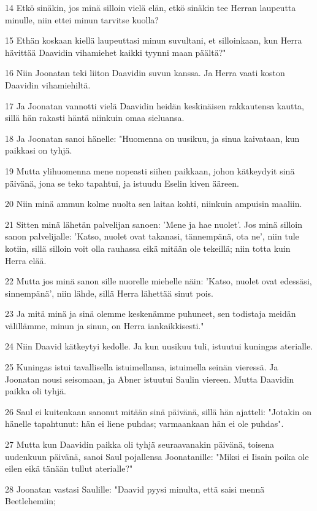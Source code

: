 \par 14 Etkö sinäkin, jos minä silloin vielä elän, etkö sinäkin tee Herran laupeutta minulle, niin ettei minun tarvitse kuolla?
\par 15 Ethän koskaan kiellä laupeuttasi minun suvultani, et silloinkaan, kun Herra hävittää Daavidin vihamiehet kaikki tyynni maan päältä?"
\par 16 Niin Joonatan teki liiton Daavidin suvun kanssa. Ja Herra vaati koston Daavidin vihamiehiltä.
\par 17 Ja Joonatan vannotti vielä Daavidin heidän keskinäisen rakkautensa kautta, sillä hän rakasti häntä niinkuin omaa sieluansa.
\par 18 Ja Joonatan sanoi hänelle: "Huomenna on uusikuu, ja sinua kaivataan, kun paikkasi on tyhjä.
\par 19 Mutta ylihuomenna mene nopeasti siihen paikkaan, johon kätkeydyit sinä päivänä, jona se teko tapahtui, ja istuudu Eselin kiven ääreen.
\par 20 Niin minä ammun kolme nuolta sen laitaa kohti, niinkuin ampuisin maaliin.
\par 21 Sitten minä lähetän palvelijan sanoen: 'Mene ja hae nuolet'. Jos minä silloin sanon palvelijalle: 'Katso, nuolet ovat takanasi, tännempänä, ota ne', niin tule kotiin, sillä silloin voit olla rauhassa eikä mitään ole tekeillä; niin totta kuin Herra elää.
\par 22 Mutta jos minä sanon sille nuorelle miehelle näin: 'Katso, nuolet ovat edessäsi, sinnempänä', niin lähde, sillä Herra lähettää sinut pois.
\par 23 Ja mitä minä ja sinä olemme keskenämme puhuneet, sen todistaja meidän välillämme, minun ja sinun, on Herra iankaikkisesti."
\par 24 Niin Daavid kätkeytyi kedolle. Ja kun uusikuu tuli, istuutui kuningas aterialle.
\par 25 Kuningas istui tavallisella istuimellansa, istuimella seinän vieressä. Ja Joonatan nousi seisomaan, ja Abner istuutui Saulin viereen. Mutta Daavidin paikka oli tyhjä.
\par 26 Saul ei kuitenkaan sanonut mitään sinä päivänä, sillä hän ajatteli: "Jotakin on hänelle tapahtunut: hän ei liene puhdas; varmaankaan hän ei ole puhdas".
\par 27 Mutta kun Daavidin paikka oli tyhjä seuraavanakin päivänä, toisena uudenkuun päivänä, sanoi Saul pojallensa Joonatanille: "Miksi ei Iisain poika ole eilen eikä tänään tullut aterialle?"
\par 28 Joonatan vastasi Saulille: "Daavid pyysi minulta, että saisi mennä Beetlehemiin;
